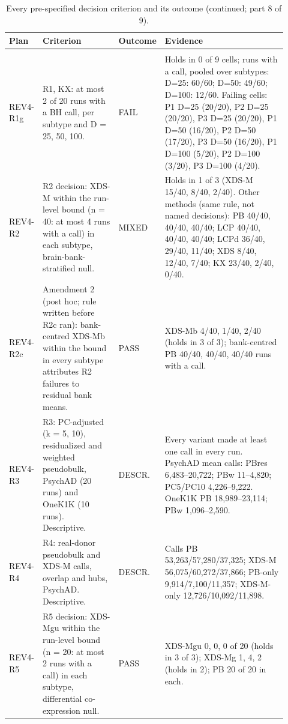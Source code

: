 \begin{table}[p]
\centering\scriptsize
\setlength{\tabcolsep}{2.5pt}\renewcommand{\arraystretch}{1.1}
\caption{Every pre-specified decision criterion and its outcome (continued; part 8 of 9).}\label{tab:criteria8}
\begin{tabular}{@{}>{\raggedright\arraybackslash}p{0.100\linewidth}>{\raggedright\arraybackslash}p{0.285\linewidth}>{\raggedright\arraybackslash}p{0.085\linewidth}>{\raggedright\arraybackslash}p{0.450\linewidth}@{}}
\toprule
Plan & Criterion & Outcome & Evidence \\
\midrule
\multicolumn{4}{@{}>{\raggedright\arraybackslash}p{0.90\linewidth}}{\textbf{Plan 5 (REV4\_PREREG), with amendments 1--5} (continued)} \\
\cmidrule(lr){1-4}
REV4-R1g & R1, KX: at most 2 of 20 runs with a BH call, per subtype and D = 25, 50, 100. & FAIL & Holds in 0 of 9 cells; runs with a call, pooled over subtypes: D=25: 60/60; D=50: 49/60; D=100: 12/60. Failing cells: P1 D=25 (20/20), P2 D=25 (20/20), P3 D=25 (20/20), P1 D=50 (16/20), P2 D=50 (17/20), P3 D=50 (16/20), P1 D=100 (5/20), P2 D=100 (3/20), P3 D=100 (4/20). \\
REV4-R2 & R2 decision: XDS-M within the run-level bound (n = 40: at most 4 runs with a call) in each subtype, brain-bank-stratified null. & MIXED & Holds in 1 of 3 (XDS-M 15/40, 8/40, 2/40). Other methods (same rule, not named decisions): PB 40/40, 40/40, 40/40; LCP 40/40, 40/40, 40/40; LCPd 36/40, 29/40, 11/40; XDS 8/40, 12/40, 7/40; KX 23/40, 2/40, 0/40. \\
REV4-R2c & Amendment 2 (post hoc; rule written before R2c ran): bank-centred XDS-Mb within the bound in every subtype attributes R2 failures to residual bank means. & PASS & XDS-Mb 4/40, 1/40, 2/40 (holds in 3 of 3); bank-centred PB 40/40, 40/40, 40/40 runs with a call. \\
REV4-R3 & R3: PC-adjusted (k = 5, 10), residualized and weighted pseudobulk, PsychAD (20 runs) and OneK1K (10 runs). Descriptive. & DESCR. & Every variant made at least one call in every run. PsychAD mean calls: PBres 6,483--20,722; PBw 11--4,820; PC5/PC10 4,226--9,222. OneK1K PB 18,989--23,114; PBw 1,096--2,590. \\
REV4-R4 & R4: real-donor pseudobulk and XDS-M calls, overlap and hubs, PsychAD. Descriptive. & DESCR. & Calls PB 53,263/57,280/37,325; XDS-M 56,075/60,272/37,866; PB-only 9,914/7,100/11,357; XDS-M-only 12,726/10,092/11,898. \\
REV4-R5 & R5 decision: XDS-Mgu within the run-level bound (n = 20: at most 2 runs with a call) in each subtype, differential co-expression null. & PASS & XDS-Mgu 0, 0, 0 of 20 (holds in 3 of 3); XDS-Mg 1, 4, 2 (holds in 2); PB 20 of 20 in each. \\

\end{tabular}
\end{table}
